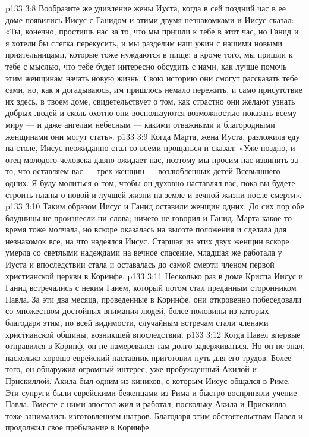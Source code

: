 \vs p133 3:8 Вообразите же удивление жены Иуста, когда в сей поздний час в ее доме появились Иисус с Ганидом и этими двумя незнакомками и Иисус сказал: «Ты, конечно, простишь нас за то, что мы пришли к тебе в этот час, но Ганид и я хотели бы слегка перекусить, и мы разделим наш ужин с нашими новыми приятельницами, которые тоже нуждаются в пище; а кроме того, мы пришли к тебе с мыслью, что тебе будет интересно обсудить с нами, как лучше помочь этим женщинам начать новую жизнь. Свою историю они смогут рассказать тебе сами, но, как я догадываюсь, им пришлось немало пережить, и само присутствие их здесь, в твоем доме, свидетельствует о том, как страстно они желают узнать добрых людей и сколь охотно они воспользуются возможностью показать всему миру --- и даже ангелам небесным --- какими отважными и благородными женщинами они могут стать».
\vs p133 3:9 Когда Марта, жена Иуста, разложила еду на столе, Иисус неожиданно стал со всеми прощаться и сказал: «Уже поздно, и отец молодого человека давно ожидает нас, поэтому мы просим нас извинить за то, что оставляем вас --- трех женщин --- возлюбленных детей Всевышнего одних. Я буду молиться о том, чтобы он духовно наставлял вас, пока вы будете строить планы о новой и лучшей жизни на земле и вечной жизни после смерти».
\vs p133 3:10 Таким образом Иисус и Ганид оставили женщин одних. До сих пор обе блудницы не произнесли ни слова; ничего не говорил и Ганид. Марта какое\hyp{}то время тоже молчала, но вскоре оказалась на высоте положения и сделала для незнакомок все, на что надеялся Иисус. Старшая из этих двух женщин вскоре умерла со светлыми надеждами на вечное спасение, младшая же работала у Иуста и впоследствии стала и оставалась до самой смерти членом первой христианской церкви в Коринфе.
\vs p133 3:11 Несколько раз в доме Криспа Иисус и Ганид встречались с неким Гаием, который потом стал преданным сторонником Павла. За эти два месяца, проведенные в Коринфе, они откровенно побеседовали со множеством достойных внимания людей, более половины из которых благодаря этим, по всей видимости, случайным встречам стали членами христианской общины, возникшей впоследствии.
\vs p133 3:12 Когда Павел впервые отправился в Коринф, он не намеревался там долго задерживаться. Но он не знал, насколько хорошо еврейский наставник приготовил путь для его трудов. Более того, он обнаружил огромный интерес, уже пробужденный Акилой и Прискиллой. Акила был одним из киников, с которым Иисус общался в Риме. Эти супруги были еврейскими беженцами из Рима и быстро восприняли учение Павла. Вместе с ними апостол жил и работал, поскольку Акила и Прискилла тоже занимались изготовлением шатров. Благодаря этим обстоятельствам Павел и продолжил свое пребывание в Коринфе.
